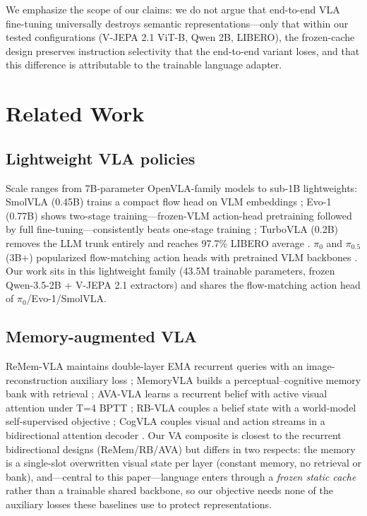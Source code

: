 \documentclass[10pt,twocolumn]{article}
\begin{document}
We emphasize the scope of our claims: we do not argue that end-to-end VLA
fine-tuning universally destroys semantic representations---only that within
our tested configurations (V-JEPA 2.1 ViT-B, Qwen 2B, LIBERO), the frozen-cache
design preserves instruction selectivity that the end-to-end variant loses,
and that this difference is attributable to the trainable language adapter.

\section{Related Work}
\label{sec:related}

\subsection{Lightweight VLA policies}
Scale ranges from 7B-parameter OpenVLA-family models to sub-1B lightweights:
SmolVLA (0.45B) trains a compact flow head on VLM embeddings
\cite{shukor2025smolvlavisionlanguageactionmodelaffordable}; Evo-1 (0.77B)
shows two-stage training---frozen-VLM action-head pretraining followed by full
fine-tuning---consistently beats one-stage training \cite{lin2025evo1lightweightvisionlanguageactionmodel}; TurboVLA
(0.2B) removes the LLM trunk entirely and reaches 97.7\% LIBERO average
\cite{xie2026turbovlarealtimevisionlanguageactionmodel}. $\pi_0$ and $\pi_{0.5}$ (3B+) popularized flow-matching
action heads with pretrained VLM backbones \cite{black2026pi0visionlanguageactionflowmodel,intelligence2025pi05visionlanguageactionmodelopenworld}. Our work sits in
this lightweight family (43.5M trainable parameters, frozen Qwen-3.5-2B +
V-JEPA 2.1 extractors) and shares the flow-matching action head of
$\pi_0$/Evo-1/SmolVLA.

\subsection{Memory-augmented VLA}
ReMem-VLA maintains double-layer EMA recurrent queries with an
image-reconstruction auxiliary loss \cite{li2026rememvlaempoweringvisionlanguageactionmodel};
MemoryVLA builds a perceptual--cognitive memory bank with retrieval
\cite{shi2026memoryvlaperceptualcognitivememoryvisionlanguageaction};
AVA-VLA learns a recurrent belief with active visual attention under T=4 BPTT
\cite{xiao2026avavlaimprovingvisionlanguageactionmodels}; RB-VLA couples a
belief state with a world-model self-supervised objective
\cite{bagaria2026recursivebeliefvisionlanguage}; CogVLA couples visual and
action streams in a bidirectional attention decoder
\cite{li2026cogvlacognitionalignedvisionlanguageactionmodel}. Our VA
composite is closest to the recurrent bidirectional designs (ReMem/RB/AVA)
but differs in two respects: the memory is a single-slot overwritten visual
state per layer (constant memory, no retrieval or bank), and---central to this
paper---language enters through a \emph{frozen static cache} rather than a
trainable shared backbone, so our objective needs none of the auxiliary
losses these baselines use to protect representations.
\end{document}
